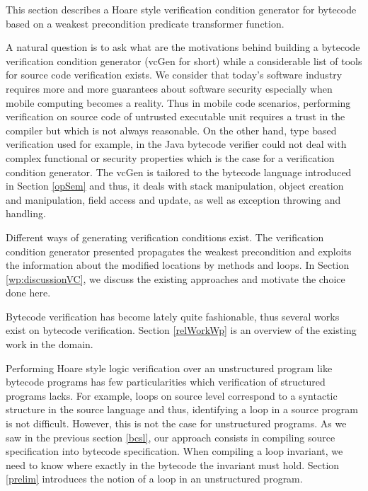 
This section describes a Hoare style verification condition generator for bytecode based on a weakest precondition predicate transformer function.
 
A natural question is to ask what are the motivations behind building a bytecode verification condition generator (vcGen for short)
while a considerable list of tools for source code verification exists.
We consider that today's software industry requires more and more guarantees about software security especially when
mobile computing becomes a reality. Thus in mobile code scenarios, performing verification on source code of untrusted executable
 unit requires a trust in the compiler but which is not always reasonable. On the other hand,
 type based verification used for example, in the Java bytecode verifier could not deal with complex functional or security
 properties which is the case for a verification condition generator.   
The vcGen is tailored to the bytecode language introduced in Section \ref{opSem} and thus, it deals
with stack manipulation, object creation and manipulation, field access and update, as well as exception throwing and handling.

Different ways of generating verification conditions exist. The verification condition
 generator presented  propagates the weakest precondition and exploits the information 
about the modified locations by methods and loops. 
In Section \ref{wp:discussionVC}, we discuss the existing approaches and motivate the choice done here.

Bytecode verification has become lately quite fashionable, thus several works exist on bytecode verification. Section \ref{relWorkWp}
is an overview of the existing work in the domain.



Performing Hoare style logic verification over an unstructured program like bytecode programs has few particularities which
verification of structured programs lacks. For example, loops on source level correspond to a syntactic structure in the source language and thus, identifying
a loop in a source program is not difficult.  However, this is not the case for unstructured programs. 
As we saw in the previous section \ref{bcsl}, our approach consists in compiling source specification into
bytecode specification. When compiling a loop invariant, we need to know where exactly in the bytecode the invariant must hold.
Section \ref{prelim} introduces the notion of a loop in an unstructured program.

